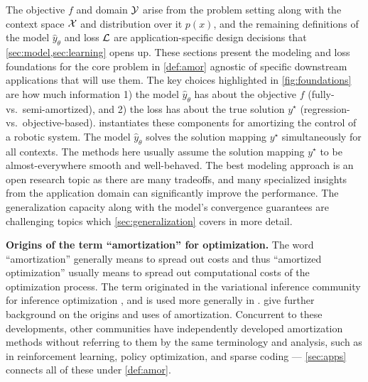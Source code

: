 The objective $f$ and domain ${\mathcal{Y}}$ arise from
the problem setting along with the context space
${\mathcal{X}}$ and distribution over it $p(x)$, and
the remaining definitions of the model
$\hat y_\theta$ and loss ${\mathcal{L}}$ are application-specific
design decisions that \cref{sec:model,sec:learning}
opens up.
These sections present the modeling and loss foundations
for the core problem in \cref{def:amor} agnostic
of specific downstream applications that will use them.
The key choices highlighted in \cref{fig:foundations}
are how much information
1) the model $\hat y_\theta$ has about the
objective $f$ (fully- vs.~semi-amortized), and
2) the loss has about the true solution $y^\star$
(regression- vs.~objective-based).
 instantiates these components
for amortizing the control of a robotic system.
The model $\hat y_\theta$ solves the solution mapping
$y^\star$ simultaneously for all contexts.
The methods here usually assume the solution mapping
$y^\star$ to be almost-everywhere smooth
and well-behaved.
The best modeling approach is an open research topic
as there are many tradeoffs,
and many specialized insights from the application domain
can significantly improve the performance.
The generalization capacity along with the model's
convergence guarantees are challenging topics
which \cref{sec:generalization} covers in more detail.

\textbf{Origins of the term ``amortization'' for optimization.}
The word ``amortization'' generally means to spread out costs and
thus ``amortized optimization'' usually means to spread out
computational costs of the optimization process.
The term originated in the variational inference community
for inference optimization
\citep{kingma2013auto,rezende2014stochastic,stuhlmuller2013learning,gershman2014amortized,webb2017faithful,ravi2018amortized,cremer2018inference,wu2020meta},
and is used more generally in
\citet{xue2020amortized,sercu2021neural,xiao2021amortized}.
\citet[p.~28]{marino2021learned} give further background on the
origins and uses of amortization.
Concurrent to these developments, other communities have
independently developed amortization methods without referring to them
by the same terminology and analysis, such as in reinforcement learning,
policy optimization, and sparse coding ---
\cref{sec:apps} connects all of these under \cref{def:amor}.

